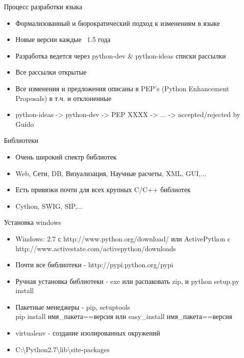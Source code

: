 \documentclass{article}
\begin{document}
\begin{center} Процесс разработки языка \end{center}
\begin{itemize}
    \item Формализованный и бюрократический подход к изменениям в языке
    \item Новые версии каждые ~1.5 года
    \item Разработка ведется через python-dev \& python-ideas списки рассылки
    \item Все рассылки открытые
    \item Все изменения и предложения описаны в PEP's (Python Enhancement Proposals) 
            в т.ч. и отклоненные
    \item python-ideas -> python-dev -> PEP XXXX -> ... -> {accepted/rejected} by Guido
\end{itemize}
\newpage

\begin{center} Библиотеки \end{center}
\begin{itemize}
    \item Очень широкий спектр библиотек
    \item Web, Сети, DB, Визуализация, Научные расчеты, XML, GUI,...
    \item Есть привязки почти для всех крупных C/C++ библиотек
    \item Cython, SWIG, SIP,...
\end{itemize}
\newpage

\begin{center} Установка windows \end{center}
\begin{itemize}
    \item Windows: 2.7 с http://www.python.org/download/
    или ActivePython c http://www.activestate.com/activepython/downloads
    \item Почти все библиотеки - http://pypi.python.org/pypi
    \item Ручная установка библиотеки - exe или распаковать zip, и python setup.py install
    \item Пакетные менеджеры - pip, setuptools \\
    	pip install имя\_пакета==версия или easy\_install имя\_пакета==версия
    \item virtualenv - создание изолированных окружений
    \item C:{\textbackslash}Python2.7{\textbackslash}lib{\textbackslash}site-packages
\end{itemize}
\newpage
\end{document}
